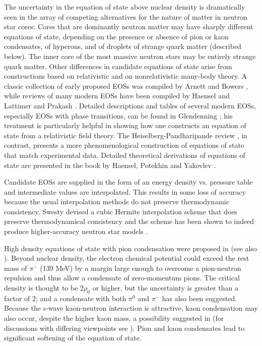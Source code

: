 \documentclass[12pt]{article}
\begin{document}
The uncertainty in the equation of state above nuclear density is
dramatically seen in the array of competing alternatives for the nature
of matter in neutron star cores:  Cores that are dominantly neutron
matter may have sharply different equations of state, depending on the
presence or absence of pion or kaon condensates, of hyperons, and of
droplets of strange quark matter (described below).  The inner core of the most massive
neutron stars may be entirely strange quark matter. Other differences
in candidate equations of state arise from constructions based on
relativistic and on nonrelativistic many-body theory.  A classic
collection of early proposed EOSs was compiled by Arnett and Bowers
\cite{AB}, 
while reviews of many modern EOSs have been compiled by 
Haensel \cite{Haensel03} and Lattimer and Prakash \cite{Lattimer2007}.  
Detailed descriptions and
tables of several modern EOSs, especially EOSs with phase transitions,
can be found in Glendenning \cite{Glendenning97}; his treatment is particularly
helpful in showing how one constructs an equation of state from a
relativistic field theory. The Heiselberg-Pandharipande review
\cite{HP00}, in contrast, presents a more phenomenological construction
of equations of state that match experimental data. Detailed theoretical
derivations of equations of state are presented in the book by 
Haensel, Potekhin and Yakovlev \cite{HaenselBook2007}.

Candidate EOSs are supplied in the form of an energy density vs.
pressure table and intermediate values are interpolated. This results
in some loss of accuracy because the usual interpolation methods do
not preserve thermodynamic consistency. Swesty \cite{S96} devised a
cubic Hermite interpolation scheme that does preserve thermodynamical
consistency and the scheme has been shown to indeed produce higher-accuracy 
neutron star models \cite{N97}.

High density equations of state with pion condensation were proposed in
 \cite{Mi71, SS73} (see also \cite{K93}).  Beyond nuclear density,
the electron chemical potential could exceed the rest mass of $\pi^-$
(139 MeV) by a margin large enough to overcome a pion-neutron repulsion
and thus allow a condensate of zero-momentum pions.  
The critical density is thought to be 2$\rho_0$ 
or higher, but the uncertainty is greater than a factor of 2; and a
condensate with both $\pi^0$ and $\pi^-$ has also been suggested.
Because the s-wave kaon-neutron interaction is attractive, kaon
condensation may also occur, despite the higher kaon mass, a
possibility suggested in \cite{KN} (for
discussions with differing viewpoints see \cite{BB94,P95,HP00}).  
Pion and kaon condensates lead to significant softening of the equation
of state. 
\end{document}
